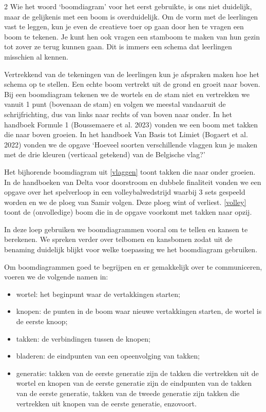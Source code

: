 \begin{multicols}{2}
Wie het woord ‘boomdiagram’ voor het eerst gebruikte, is ons niet duidelijk, maar de gelijkenis met een boom is overduidelijk. Om de vorm met de leerlingen vast te leggen, kun je even de creatieve toer op gaan door hen te vragen een boom te tekenen. Je kunt hen ook vragen een stamboom te maken van hun gezin tot zover ze terug kunnen gaan. Dit is immers een schema dat leerlingen misschien al kennen.

Vertrekkend van de tekeningen van de leerlingen kun je afspraken maken hoe het schema op te stellen. Een echte boom vertrekt uit de grond en groeit naar boven. Bij een boomdiagram tekenen we de wortels en de stam niet en vertrekken we vanuit 1 punt (bovenaan de stam) en volgen we meestal vandaaruit de schrijfrichting, dus van links naar rechts of van boven naar onder. In het handboek Formule 1 (Boussemaere et al. 2023) vonden we een boom met takken die naar boven groeien.
In het handboek Van Basis tot Limiet (Bogaert et al. 2022) vonden we de opgave `Hoeveel soorten verschillende vlaggen kun je maken met de drie kleuren (verticaal getekend) van de Belgische vlag?'

Het bijhorende boomdiagram uit \autoref{vlaggen} toont takken die naar onder groeien.  
In de handboeken van Delta voor doorstroom en dubbele finaliteit vonden we een opgave over het spelverloop in een volleybalwedstrijd waarbij 3 sets gespeeld worden en we de ploeg van Samir volgen. Deze ploeg wint of verliest. \autoref{volley} toont de (onvolledige) boom die in de opgave voorkomt met takken naar opzij.

In deze loep gebruiken we boomdiagrammen vooral om te tellen en kansen te berekenen. We spreken verder over telbomen en kansbomen zodat uit de benaming duidelijk blijkt voor welke toepassing we het boomdiagram gebruiken. 

Om boomdiagrammen goed te begrijpen en er gemakkelijk over te communiceren, voeren we de volgende namen in:
\begin{itemize}
    \item wortel: het beginpunt waar de vertakkingen starten;
\item knopen: de punten in de boom waar nieuwe vertakkingen starten, de wortel is de eerste knoop; 
\item takken: de verbindingen tussen de knopen;
\item bladeren: de eindpunten van een opeenvolging van takken;
\item generatie: takken van de eerste generatie zijn de takken die vertrekken uit de wortel en knopen van de eerste generatie zijn de eindpunten van de takken van de eerste generatie, takken van de tweede generatie zijn takken die vertrekken uit knopen van de eerste generatie, enzovoort. 
\end{itemize}


\end{multicols}
